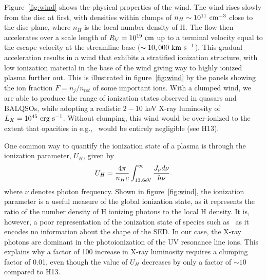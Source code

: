 \documentclass[useAMS,usenatbib]{mn2e_x}
\begin{document}
\noindent
Figure~\ref{fig:wind} shows the physical properties of the wind.
The wind rises slowly from the disc at first, with densities within clumps
of $n_H \sim 10^{11}~\rm{cm^{-3}}$ close to the disc plane, 
where $n_H$ is the local number density of H.
The flow then accelerates over a scale length of $R_V=10^{19}~\rm{cm}$
up to a terminal velocity equal to the escape velocity at the streamline base
($\sim10,000~\rm{km~s^{-1}}$). This gradual acceleration results in
a wind that exhibits a stratified ionization structure, with low ionization material
in the base of the wind giving way to highly ionized plasma further out.
This is illustrated in figure~\ref{fig:wind} 
by the panels showing the ion fraction $F=n_j/n_{tot}$ of some important ions.
With a clumped wind, we are able to produce the range of ionization states observed
in quasars and BALQSOs, while adopting a realistic $2-10$ keV X-ray luminosity
of $L_{X}=10^{45}~\rm{erg~s^{-1}}$. Without clumping, this wind would be over-ionized 
to the extent that opacities in e.g., \civ\ would be entirely negligible (see H13).

One common way to quantify the ionization state of a plasma
is through the ionization parameter, $U_H$, given by
\begin{equation}
U_H = \frac{4\pi}{n_H c}\int_{13.6{\rm{eV}}}^{\infty}\frac{{J_{\nu}d\nu}}{h\nu}.
\end{equation}
\noindent where $\nu$ denotes photon 
frequency. Shown in figure~\ref{fig:wind},
the ionization parameter is a useful measure of the global ionization state,
as it represents the ratio of the number density of 
H ionizing photons to the local H density.
It is, however, a poor representation of the 
ionization state of species such as \civ\ as it encodes no information
about the shape of the SED. In our case, the X-ray photons 
are dominant in the photoionization of the UV resonance line ions. 
This explains why a factor of 100 increase in X-ray luminosity requires
a clumping factor of 0.01, even though the value of $U_H$ decreases by only a factor of $\sim10$ compared to H13. 
\end{document}
